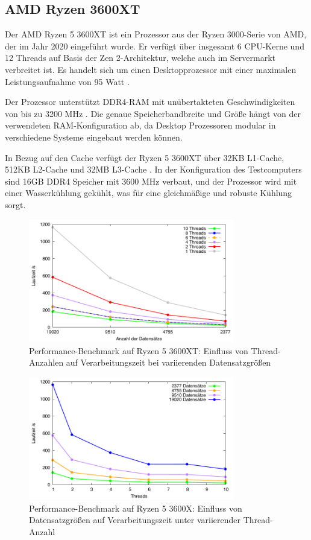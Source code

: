 \subsection{AMD Ryzen 3600XT}
Der AMD Ryzen 5 3600XT ist ein Prozessor aus der Ryzen 3000-Serie von AMD, der im Jahr 2020 eingeführt wurde. Er verfügt über insgesamt 6 CPU-Kerne und 12 Threads auf Basis der Zen 2-Architektur, welche auch im Servermarkt verbreitet ist. Es handelt sich um einen Desktopprozessor mit einer maximalen Leistungsaufnahme von 95 Watt \citep{Ryzen_Technische_Daten}.

Der Prozessor unterstützt DDR4-RAM mit unübertakteten Geschwindigkeiten von bis zu 3200 MHz \citep{Ryzen_Technische_Daten}. Die genaue Speicherbandbreite und Größe hängt von der verwendeten RAM-Konfiguration ab, da Desktop Prozessoren modular in verschiedene Systeme eingebaut werden können.

In Bezug auf den Cache verfügt der Ryzen 5 3600XT über 32KB L1-Cache, 512KB L2-Cache und 32MB L3-Cache \citep{Ryzen_Technische_Daten}. In der Konfiguration des Testcomputers sind 16GB DDR4 Speicher mit 3600 MHz verbaut, und der Prozessor wird mit einer Wasserkühlung gekühlt, was für eine gleichmäßige und robuste Kühlung sorgt.

\begin{figure}[H]
\centering
\includegraphics[width=0.8\textwidth]{../results/plots/3600xt/comp_all_threads.pdf}
\caption{Performance-Benchmark auf Ryzen 5 3600XT: Einfluss von Thread-Anzahlen auf Verarbeitungszeit bei variierenden Datensatzgrößen}
\label{fig:ryzen_benchmark_threads}
\end{figure}

\begin{figure}[H]
\centering
\includegraphics[width=0.8\textwidth]{../results/plots/3600xt/comp_all_partitions.pdf}
\caption{Performance-Benchmark auf Ryzen 5 3600X: Einfluss von Datensatzgrößen auf Verarbeitungszeit unter variierender Thread-Anzahl}
\label{fig:ryzen_benchmark_partitions}
\end{figure}

